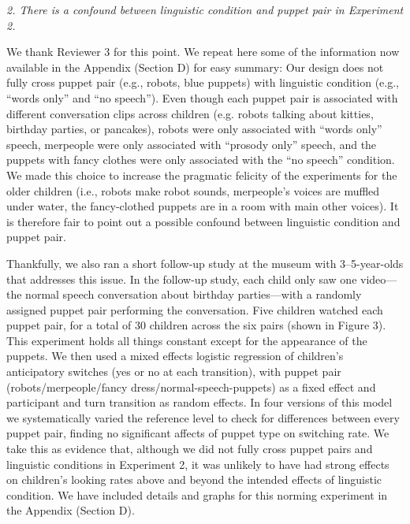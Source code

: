 \documentclass[11pt,a4paper]{letter} %
\begin{document}
\begin{letter}{}
\smallskip

\noindent \textit{2. There is a confound between linguistic condition and puppet pair in Experiment 2.}

\noindent We thank Reviewer 3 for this point. We repeat here some of the information now available in the Appendix (Section D) for easy summary: Our design does not fully cross puppet pair (e.g., robots, blue puppets) with linguistic condition (e.g., ``words only'' and ``no speech''). Even though each puppet pair is associated with different conversation clips across children (e.g. robots talking about kitties, birthday parties, or pancakes), robots were only associated with ``words only'' speech, merpeople were only associated with ``prosody only'' speech, and the puppets with fancy clothes were only associated with the ``no speech'' condition. We made this choice to increase the pragmatic felicity of the experiments for the older children (i.e., robots make robot sounds, merpeople's voices are muffled under water, the fancy-clothed puppets are in a room with main other voices). It is therefore fair to point out a possible confound between linguistic condition and puppet pair. 

Thankfully, we also ran a short follow-up study at the museum with 3--5-year-olds that addresses this issue. In the follow-up study, each child only saw one video---the normal speech conversation about birthday parties---with a randomly assigned puppet pair performing the conversation. Five children watched each puppet pair, for a total of 30 children across the six pairs (shown in Figure 3). This experiment holds all things constant except for the appearance of the puppets. We then used a mixed effects logistic regression of children's anticipatory switches (yes or no at each transition), with puppet pair (robots/merpeople/fancy dress/normal-speech-puppets) as a fixed effect and participant and turn transition as random effects. In four versions of this model we systematically varied the reference level to check for differences between every puppet pair, finding no significant affects of puppet type on switching rate. We take this as evidence that, although we did not fully cross puppet pairs and linguistic conditions in Experiment 2, it was unlikely to have had strong effects on children's looking rates above and beyond the intended effects of linguistic condition. We have included details and graphs for this norming experiment in the Appendix (Section D). 

\smallskip


\end{letter}
\end{document}
